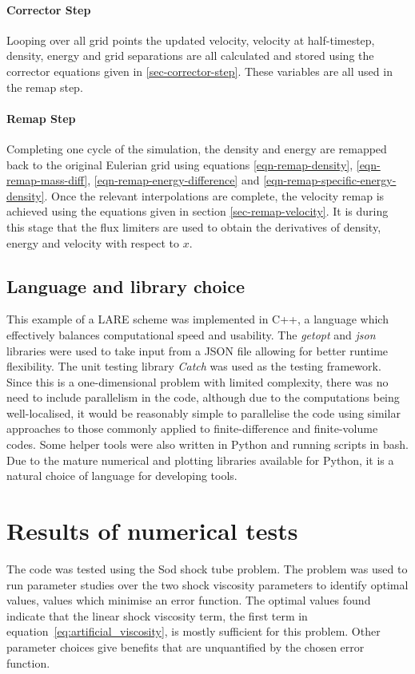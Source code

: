 \paragraph{Corrector Step}
Looping over all grid points the updated velocity, velocity at half-timestep, density, energy and grid separations are all calculated and stored using the corrector equations given in \ref{sec-corrector-step}. These variables are all used in the remap step.

\paragraph{Remap Step}
Completing one cycle of the simulation, the density and energy are remapped back to the original Eulerian grid using equations \eqref{eqn-remap-density}, \eqref{eqn-remap-mass-diff}, \eqref{eqn-remap-energy-difference} and \eqref{eqn-remap-specific-energy-density}. Once the relevant interpolations are complete, the velocity remap is achieved using the equations given in section \ref{sec-remap-velocity}. It is during this stage that the flux limiters are used to obtain the derivatives of density, energy and velocity with respect to $x$.

\subsection{Language and library choice}
This example of a LARE scheme was implemented in C++, a language which effectively balances computational speed and usability. The \emph{getopt} and \emph{json} libraries were used to take input from a JSON file allowing for better runtime flexibility. The unit testing library \emph{Catch} was used as the testing framework. Since this is a one-dimensional problem with limited complexity, there was no need to include parallelism in the code, although due to the computations being well-localised, it would be reasonably simple to parallelise the code using similar approaches to those commonly applied to finite-difference and finite-volume codes. Some helper tools were also written in Python and running scripts in bash. Due to the mature numerical and plotting libraries available for Python, it is a natural choice of language for developing tools.

\section{Results of numerical tests}

The code was tested using the Sod shock tube problem. The problem was used to run parameter studies over the two shock viscosity parameters to identify optimal values, values which minimise an error function. The optimal values found indicate that the linear shock viscosity term, the first term in equation~\ref{eq:artificial_viscosity}, is mostly sufficient for this problem. Other parameter choices give benefits that are unquantified by the chosen error function.


